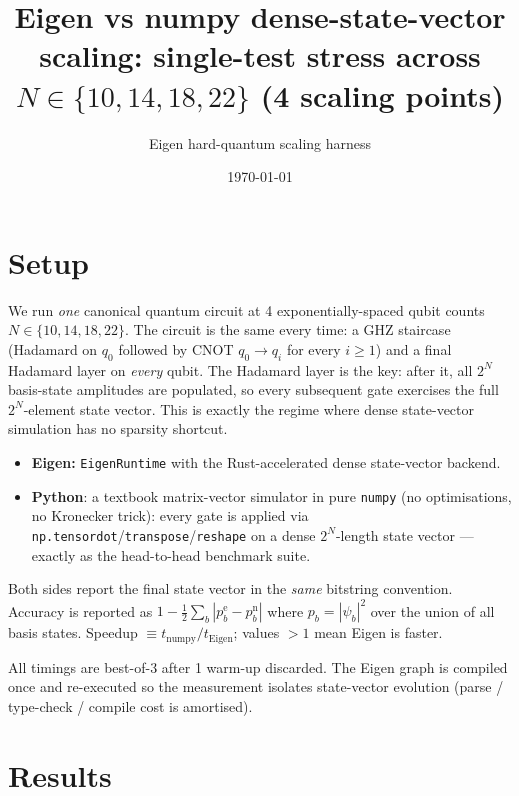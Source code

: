 \documentclass[11pt,a4paper]{article}
\title{Eigen vs numpy dense-state-vector scaling: single-test stress across
\(N \in \{10,14,18,22\}\) (4 scaling points)}
\author{Eigen hard-quantum scaling harness}
\date{\today}
\begin{document}
\maketitle

\section{Setup}

We run \emph{one} canonical quantum circuit at 4 exponentially-spaced qubit
counts \(N \in \{10,14,18,22\}\).  The
circuit is the same every time: a GHZ staircase (Hadamard on \(q_0\) followed
by CNOT \(q_0 \to q_i\) for every \(i\ge 1\)) and a final Hadamard layer on
\emph{every} qubit. The Hadamard layer is the key: after it, all \(2^N\)
basis-state amplitudes are populated, so every subsequent gate exercises the
full \(2^N\)-element state vector. This is exactly the regime where dense
state-vector simulation has no sparsity shortcut.

\begin{itemize}
  \item \textbf{Eigen:} \texttt{EigenRuntime} with the Rust-accelerated dense
      state-vector backend.
  \item \textbf{Python}: a textbook matrix-vector simulator in pure
      \texttt{numpy} (no optimisations, no Kronecker trick): every gate is
      applied via \texttt{np.tensordot}/\texttt{transpose}/\texttt{reshape}
      on a dense \(2^N\)-length state vector — exactly as the head-to-head
      benchmark suite.
\end{itemize}

Both sides report the final state vector in the \emph{same} bitstring
convention.  Accuracy is reported as \(1-\tfrac{1}{2}\sum_b|p^{\text{e}}_b -
p^{\text{n}}_b|\) where \(p_b = |\psi_b|^2\) over the union of all basis states.
Speedup \(\equiv t_{\text{numpy}} / t_{\text{Eigen}}\); values \(>1\) mean Eigen
is faster.

All timings are best-of-3 after 1 warm-up discarded.  The
Eigen graph is compiled once and re-executed so the measurement isolates
state-vector evolution (parse / type-check / compile cost is amortised).

\section{Results}
\end{document}
